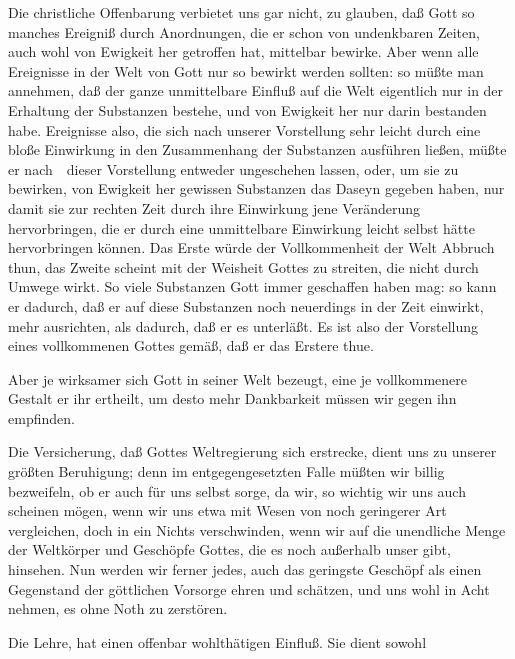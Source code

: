 \begin{aufza}
\begin{aufzb}
 Die christliche Offenbarung verbietet uns gar nicht, zu glauben, daß Gott so manches Ereigniß durch Anordnungen, die er schon von undenkbaren Zeiten, auch wohl von Ewigkeit her getroffen hat, mittelbar bewirke. Aber wenn alle Ereignisse in der Welt von Gott nur so bewirkt werden sollten: so müßte man annehmen, daß der ganze unmittelbare Einfluß auf die Welt eigentlich nur in der Erhaltung der Substanzen bestehe, und von Ewigkeit her nur darin bestanden habe. Ereignisse also, die sich nach unserer Vorstellung sehr leicht durch eine bloße Einwirkung in den Zusammenhang der Substanzen ausführen ließen, müßte er nach~\ dieser Vorstellung entweder ungeschehen lassen, oder, um sie zu bewirken, von Ewigkeit her gewissen Substanzen das Daseyn gegeben haben, nur damit sie zur rechten Zeit durch ihre Einwirkung jene Veränderung hervorbringen, die er durch eine unmittelbare Einwirkung leicht selbst hätte hervorbringen können. Das Erste würde der Vollkommenheit der Welt Abbruch thun, das Zweite scheint mit der Weisheit Gottes zu streiten, die nicht durch Umwege wirkt. So viele Substanzen Gott immer geschaffen haben mag: so kann er dadurch, daß er auf diese Substanzen noch neuerdings in der Zeit einwirkt, mehr ausrichten, als dadurch, daß er es unterläßt. Es ist also der Vorstellung eines vollkommenen Gottes gemäß, daß er das Erstere thue.
\item Aber je wirksamer sich Gott in seiner Welt bezeugt, eine je vollkommenere Gestalt er ihr ertheilt, um desto mehr Dankbarkeit müssen wir gegen ihn empfinden.
\item Die Versicherung, daß Gottes Weltregierung sich  erstrecke, dient uns zu unserer größten Beruhigung; denn im entgegengesetzten Falle müßten wir billig bezweifeln, ob er auch für uns selbst sorge, da wir, so wichtig wir uns auch scheinen mögen, wenn wir uns etwa mit Wesen von noch geringerer Art vergleichen, doch in ein Nichts verschwinden, wenn wir auf die unendliche Menge der Weltkörper und Geschöpfe Gottes, die es noch außerhalb unser gibt, hinsehen. Nun werden wir ferner jedes, auch das geringste Geschöpf als einen Gegenstand der göttlichen Vorsorge ehren und schätzen, und uns wohl in Acht nehmen, es ohne Noth zu zerstören.
\end{aufzb}
\item Die Lehre,  hat einen offenbar wohlthätigen Einfluß. Sie dient sowohl

\end{aufza}
